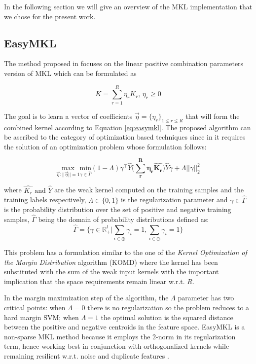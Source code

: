 In the following section we will give an overview of the MKL implementation
that we chose for the present work.

\subsection{EasyMKL}
\label{subsec:easymkl}

The method proposed in \cite{aiolli2015easymkl} focuses on the linear positive combination
parameters version of MKL which can be formulated as

\begin{equation}
    K = \sum_{r=1}^R \eta_rK_r,\, \eta_r \geq 0
    \label{eq:easymkl}
\end{equation}

The goal is to learn a vector of coefficients $\vec{\eta}=\{\eta_r\}_{1\leq r \leq R}$ that will form the
combined kernel according to Equation \ref{eq:easymkl}.
The proposed algorithm can be ascribed to the category of optimization based
techniques since in it requires the solution of an optimization problem whose
formulation follows:

\begin{equation}
    \underset{\vec{\eta}:||\vec{\eta}||=1}{\mathrm{max}}\underset{\gamma \in \hat{\Gamma}}{\mathrm{min}}(1-\Lambda)\gamma^\top\hat{Y}\Big(\boldsymbol{\sum_r^R \eta_r\hat{K_r}}\Big)\hat{Y}\gamma+\Lambda||\gamma||^2_2
    \label{eq:easymin}
\end{equation}

where $\hat{K_r}\text{ and }\hat{Y}$ are the weak kernel computed on the training samples
and the training labels respectively, $\Lambda \in \{0,1\}$ is the regularization
parameter and $\gamma \in \hat{\Gamma}$ is the probability distribution over the set of positive and
negative training samples, $\hat{\Gamma}$ being the domain of probability distributions defined as:
\[ \hat{\Gamma} = \Big\{ \gamma \in \mathbb{R}^l_+ | \sum_{i \in \oplus} \gamma_i = 1, \sum_{i \in \ominus} \gamma_i = 1 \Big\} \]

This problem has a formulation similar to the one of the \emph{Kernel Optimization of the
Margin Distribution} algorithm (KOMD) \cite{Aiolli2008} where the kernel has been
substituted with the sum of the weak input kernels with the important implication
that the space requirements remain linear w.r.t. $R$.

In the margin maximization step of the algorithm, the $\Lambda$ parameter
has two critical points: when $\Lambda = 0$ there is no regularization so the
problem reduces to a hard margin SVM; when $\Lambda = 1$ the optimal solution is
the squared distance between the positive and negative centroids in the feature
space.
EasyMKL is a non-sparse MKL method because it employs the 2-norm in its regularization
term, hence working best in conjunction with orthogonalized kernels while remaining
resilient w.r.t. noise and duplicate features \cite{KloBreSonZie11}.

